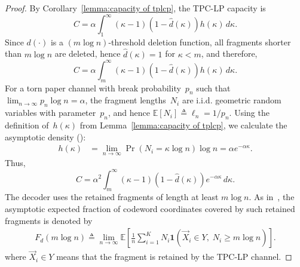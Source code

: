 \documentclass[journal,letterpaper,onecolumn,11pt]{IEEEtran}
\begin{document}
\begin{proof}
By Corollary~\ref{lemma:capacity of tplcp}, the TPC-LP capacity is
\[
    C
    =
    \alpha
    \int_{1}^{\infty}
    (\kappa-1)(1-\hat d(\kappa))h(\kappa)\,d\kappa.
\]
Since $d(\cdot)$ is a $(m\log n)$-threshold deletion function, all fragments shorter than
$m\log n$ are deleted, hence $\hat d(\kappa)=1$ for $\kappa<m$, and therefore,
\[
    C
    =
    \alpha
    \int_{m}^{\infty}
    (\kappa-1)(1-\hat d(\kappa))h(\kappa)\,d\kappa.
\]
For a torn paper channel with break probability~$p_n$ such that~$\lim_{n\to\infty}p_n\log n= \alpha$, the fragment lengths~$N_i$ are i.i.d. geometric random variables with parameter~$p_n$, and hence $\mathbb{E}[N_i] \triangleq \ell_n = 1/p_n$. Using the definition of~$h(\kappa)$ from Lemma~\ref{lemma:capacity of tplcp}, we calculate the asymptotic density (\cite[Eq.(14)]{ravi2024recovering}):
\begin{align}\label{eq:hkappa}
    h(\kappa) &= \lim_{n\to\infty} \Pr(N_i = \kappa\log n)\log n = \alpha e^{-\alpha\kappa}.
\end{align}
Thus,
\[
    C
    =
    \alpha^2
    \int_{m}^{\infty}
    (\kappa-1)(1-\hat d(\kappa))e^{-\alpha\kappa}\,d\kappa.
\]
The decoder uses the retained fragments of length at least $m\log n$. 
As in~\cite[Definition~1]{ravi2024recovering}, the asymptotic expected fraction of codeword coordinates covered by such retained fragments is denoted by
\begin{align}\label{equation:f_d(mlogn)}
        F_d(m\log n)
    \triangleq
    \lim_{n\to\infty}
    \mathbb{E}\left[
        \frac{1}{n}
        \sum_{i=1}^{K}
        N_i
        \mathbf{1}(\vec{X}_i\in Y,\;N_i\ge m\log n)
    \right].
\end{align}
where $\vec{X}_i\in Y$ means that the fragment is retained by the TPC-LP channel.


\end{proof}
\end{document}
